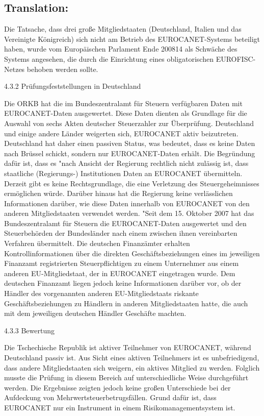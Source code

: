 \documentclass[10pt]{article}
\begin{document}
\pagebreak

\subsection*{Translation:}

Die Tatsache, dass drei große Mitgliedstaaten (Deutschland, Italien und das Vereinigte Königreich) sich nicht am Betrieb des EUROCANET-Systems beteiligt haben, wurde vom Europäischen Parlament Ende 200814 als Schwäche des Systems angesehen, die durch die Einrichtung eines obligatorischen EUROFISC-Netzes behoben werden sollte.


4.3.2 Prüfungsfeststellungen in Deutschland

Die ORKB hat die im Bundeszentralamt für Steuern verfügbaren Daten mit EUROCANET-Daten ausgewertet.
Diese Daten dienten als Grundlage für die Auswahl von sechs Akten deutscher Steuerzahler zur Überprüfung.
Deutschland und einige andere Länder weigerten sich, EUROCANET aktiv beizutreten.
Deutschland hat daher einen passiven Status, was bedeutet, dass es keine Daten nach Brüssel schickt, sondern nur EUROCANET-Daten erhält.
Die Begründung dafür ist, dass es "nach Ansicht der Regierung rechtlich nicht zulässig ist, dass staatliche (Regierungs-) Institutionen Daten an EUROCANET übermitteln.
Derzeit gibt es keine Rechtsgrundlage, die eine Verletzung des Steuergeheimnisses ermöglichen würde.
Darüber hinaus hat die Regierung keine verlässlichen Informationen darüber, wie diese Daten innerhalb von EUROCANET von den anderen Mitgliedstaaten verwendet werden. "Seit dem 15. Oktober 2007 hat das Bundeszentralamt für Steuern die EUROCANET-Daten ausgewertet und den Steuerbehörden der Bundesländer nach einem zwischen ihnen vereinbarten Verfahren übermittelt.
Die deutschen Finanzämter erhalten Kontrollinformationen über die direkten Geschäftsbeziehungen eines im jeweiligen Finanzamt registrierten Steuerpflichtigen zu einem Unternehmer aus einem anderen EU-Mitgliedstaat, der in EUROCANET eingetragen wurde.
Dem deutschen Finanzamt liegen jedoch keine Informationen darüber vor, ob der Händler des vorgenannten anderen EU-Mitgliedstaats riskante Geschäftsbeziehungen zu Händlern in anderen Mitgliedstaaten hatte, die auch mit dem jeweiligen deutschen Händler Geschäfte machten.


4.3.3 Bewertung

Die Tschechische Republik ist aktiver Teilnehmer von EUROCANET, während Deutschland passiv ist.
Aus Sicht eines aktiven Teilnehmers ist es unbefriedigend, dass andere Mitgliedstaaten sich weigern, ein aktives Mitglied zu werden.
Folglich musste die Prüfung in diesem Bereich auf unterschiedliche Weise durchgeführt werden.
Die Ergebnisse zeigten jedoch keine großen Unterschiede bei der Aufdeckung von Mehrwertsteuerbetrugsfällen. Grund dafür ist, dass EUROCANET nur ein Instrument in einem Risikomanagementsystem ist.
\end{document}
